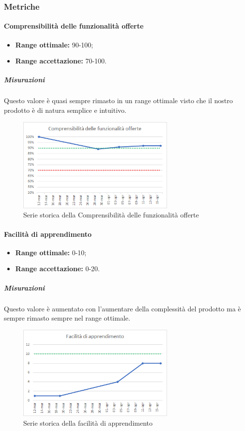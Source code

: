 		\subsubsection{Metriche}
			\paragraph{Comprensibilità delle funzionalità offerte} \Spazio 
			\begin{itemize}
				\item {\textbf{Range ottimale:} 90-100;}
				\item {\textbf{Range accettazione:} 70-100.}
			\end{itemize} 
		   \subparagraph{Misurazioni}
		   Questo valore è quasi sempre rimasto in un range ottimale visto che il nostro prodotto è di natura semplice e intuitivo.
		    \begin{figure}[H]
		   	\centering 
		    	\includegraphics[width=0.7\textwidth]{Images/compr.png}
		    	\caption{Serie storica della Comprensibilità delle funzionalità offerte}
		    	\label{compr} 
		    \end{figure}
	        
			\paragraph{Facilità di apprendimento} \Spazio 
			\begin{itemize}
				\item {\textbf{Range ottimale:} 0-10;}
				\item {\textbf{Range accettazione:} 0-20.}
			\end{itemize} 
			 \subparagraph{Misurazioni}
			 Questo valore è aumentato con l'aumentare della complessità del prodotto ma è sempre rimasto sempre nel range ottimale.
			\begin{figure}[H]
				\centering 
				\includegraphics[width=0.7\textwidth]{Images/fac.png}
				\caption{Serie storica della facilità di apprendimento}
				\label{fac} 
			\end{figure}
		    

